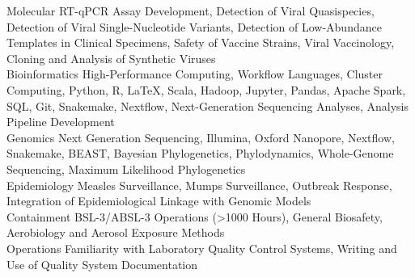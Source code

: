 \begin{cvskills}
   \cvskill
    {Molecular} %
    {RT-qPCR Assay Development, Detection of Viral Quasispecies, Detection of Viral Single-Nucleotide Variants, Detection of Low-Abundance Templates in Clinical Specimens, Safety of Vaccine Strains, Viral Vaccinology, Cloning and Analysis of Synthetic Viruses} \\%
      \vspace{-4.0mm}
  \cvskill
    {Bioinformatics} %
    {High-Performance Computing, Workflow Languages, Cluster Computing, Python, R, LaTeX, Scala, Hadoop, Jupyter, Pandas, Apache Spark, SQL, Git, Snakemake, Nextflow, Next-Generation Sequencing Analyses, Analysis Pipeline Development} \\%
      \vspace{-4.0mm}
  \cvskill
    {Genomics} %
    {Next Generation Sequencing, Illumina, Oxford Nanopore, Nextflow, Snakemake, BEAST, Bayesian Phylogenetics, Phylodynamics, Whole-Genome Sequencing, Maximum Likelihood Phylogenetics} \\%
      \vspace{-4.0mm}
  \cvskill
    {Epidemiology} %
    {Measles Surveillance, Mumps Surveillance, Outbreak Response, Integration of Epidemiological Linkage with Genomic Models} \\%
      \vspace{-4.0mm}
  \cvskill
    {Containment} %
    {BSL-3/ABSL-3 Operations (>1000 Hours), General Biosafety, Aerobiology and Aerosol Exposure Methods} \\%
         \vspace{-4.0mm} 
  \cvskill
    {Operations} %
    {Familiarity with Laboratory Quality Control Systems, Writing and Use of Quality System Documentation} %
\end{cvskills}
